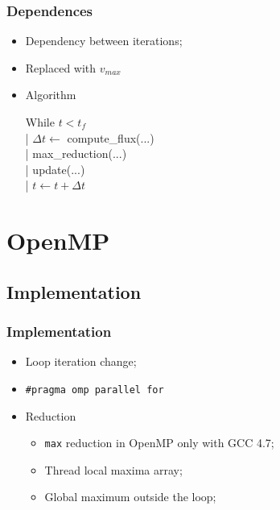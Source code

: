 \documentclass{beamer}
\begin{document}
\begin{frame}
	\frametitle{Dependences}




\begin{center}
\parbox{0.5\textwidth}{
\begin{itemize}
\item{Dependency between iterations;}
\item{Replaced with $v_{max}$}
\item{Algorithm
		\begin{center}
		\parbox{0.5\textwidth}{\ttfamily
		While $t < t_{f}$	\\
		 |  $\Delta t \leftarrow$ compute\_flux(...)	\\
		 |  max\_reduction(...)	\\
		 |  update(...)	\\
		 |  $t \leftarrow t + \Delta t$	\\
		}
		\end{center}
		}
\end{itemize}
}
\end{center}

\end{frame}




\section{OpenMP}
\subsection{Implementation}
\begin{frame}
	\frametitle{Implementation}

\begin{itemize}
\item{Loop iteration change;}
\item{\texttt{\#pragma omp parallel for}}
\item{Reduction
	\begin{itemize}
	\item{\texttt{max} reduction in OpenMP only with GCC 4.7;}
	\item{Thread local maxima array;}
	\item{Global maximum outside the loop;}
	\end{itemize}
	}
\end{itemize}

\end{frame}
\end{document}
